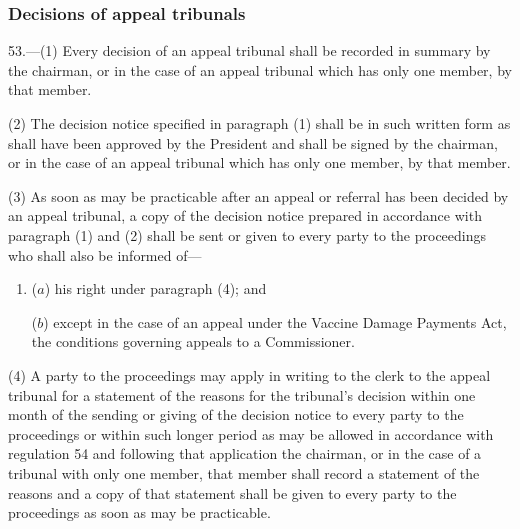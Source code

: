 \documentclass[12pt,a4paper]{article}
\begin{document}
\subsubsection[53. Decisions of appeal tribunals]{Decisions of appeal tribunals}

53.—(1) Every decision of an appeal tribunal shall be recorded in summary by the chairman, or in the case of an appeal tribunal which has only one member, by that member.

(2) The decision notice specified in paragraph (1) shall be in such written form as shall have been approved by the President and shall be signed by the chairman, or in the case of an appeal tribunal which has only one member, by that member.

(3) As soon as may be practicable after an appeal or referral has been decided by an appeal tribunal, a copy of the decision notice prepared in accordance with paragraph (1) and (2) shall be sent or given to every party to the proceedings who shall also be informed of—
\begin{enumerate}\item[]
($a$) his right under paragraph (4); and


($b$) except in the case of an appeal under the Vaccine Damage Payments Act, the conditions governing appeals to a Commissioner.
\end{enumerate}


(4) A party to the proceedings may apply in writing to the clerk to the appeal tribunal for a statement of the reasons for the tribunal’s decision within one month of the sending or giving of the decision notice to every party to the proceedings or within such longer period as may be allowed in accordance with regulation 54 and following that application the chairman, or in the case of a tribunal with only one member, that member shall record a statement of the reasons and a copy of that statement shall be given to every party to the proceedings as soon as may be practicable.
\end{document}
